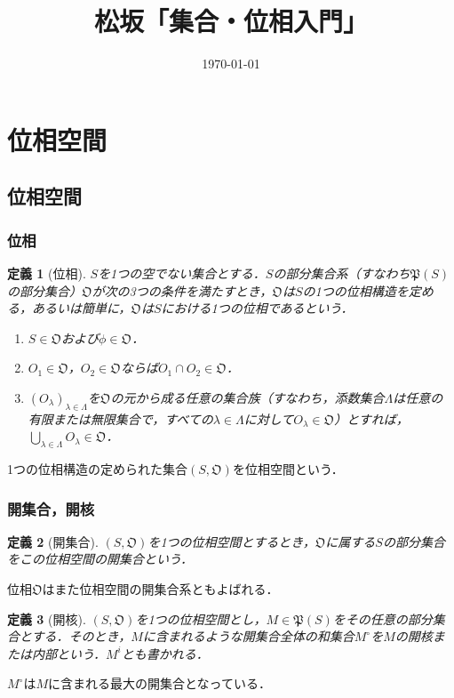 \documentclass[a4paper,10pt,uplatex]{jsarticle}
\numberwithin{equation}{section}
\theoremstyle{mystyle}
\newtheorem{dfn}{定義}[section]
\newcommand{\gO}{\mathfrak{O}}
\newcommand{\gP}{\mathfrak{P}}
\begin{document}
\title{松坂「集合・位相入門」}
\author{}
\date{\today}
\maketitle

\section{位相空間}
\subsection{位相空間}
\subsubsection{位相}
\begin{dfn}[位相]
    $S$を1つの空でない集合とする．$S$の部分集合系（すなわち$\gP(S)$の部分集合）$\gO$が次の3つの条件を満たすとき，$\gO$は$S$の1つの位相構造を定める，あるいは簡単に，$\gO$は$S$における1つの位相であるという．
    \begin{enumerate}
        \item $S\in\gO$および$\phi\in\gO$． \label{dfn:位相の条件1}
        \item $O_1\in\gO$，$O_2\in\gO$ならば$O_1\cap O_2\in\gO$． \label{dfn:位相の条件2}
        \item $(O_\lambda)_{\lambda\in\Lambda}$を$\gO$の元から成る任意の集合族（すなわち，添数集合$\Lambda$は任意の有限または無限集合で，すべての$\lambda\in\Lambda$に対して$O_\lambda\in\gO$）とすれば，$\bigcup_{\lambda\in\Lambda} O_\lambda \in \gO$． \label{dfn:位相の条件3}
    \end{enumerate}
\end{dfn}

1つの位相構造の定められた集合$(S,\gO)$を位相空間という．

\subsubsection{開集合，開核}
\begin{dfn}[開集合]
    $(S,\gO)$を1つの位相空間とするとき，$\gO$に属する$S$の部分集合をこの位相空間の開集合という．
\end{dfn}
位相$\gO$はまた位相空間の開集合系ともよばれる．

\begin{dfn}[開核]
    $(S,\gO)$を1つの位相空間とし，$M\in \gP(S)$をその任意の部分集合とする．そのとき，$M$に含まれるような開集合全体の和集合$M^\circ$を$M$の開核または内部という．$M^i$とも書かれる．
\end{dfn}
$M^\circ$は$M$に含まれる最大の開集合となっている．
\end{document}
